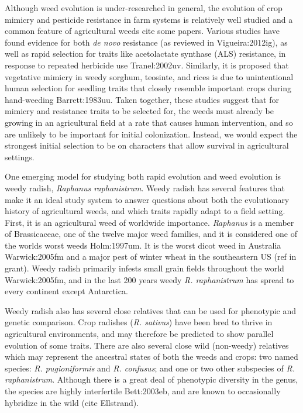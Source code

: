\documentclass[twocolumn]{bmcart}%
\begin{document}
Although weed evolution is under-researched in general, the evolution of crop mimicry and pesticide resistance in farm systems is relatively well studied and a common feature of agricultural weeds {cite some papers}. Various studies have found evidence for both \textit{de novo} resistance (as reviewed in {Vigueira:2012ig}), as well as rapid selection for traits like acetolactate synthase (ALS) resistance, in response to repeated herbicide use {Tranel:2002uv}. Similarly, it is proposed that vegetative mimicry in weedy sorghum, teosinte, and rices is due to unintentional human selection for seedling traits that closely resemble important crops during hand-weeding {Barrett:1983uu}.  Taken together, these studies suggest that for mimicry and resistance traits to be selected for, the weeds must already be growing in an agricultural field at a rate that causes human intervention, and so are unlikely to be important for initial colonization. Instead, we would expect the strongest initial selection to be on characters that allow survival in agricultural settings. 
%
%
%
%
%
%
    
One emerging model for studying both rapid evolution and weed evolution is weedy radish, \textit{Raphanus raphanistrum}. Weedy radish has several features that make it an ideal study system to answer questions about both the evolutionary history of agricultural weeds, and which traits rapidly adapt to a field setting. First, it is an agricultural weed of worldwide importance. \textit{Raphanus} is a member of Brassicaceae, one of the twelve major weed families, and it is considered one of the worlds worst weeds {Holm:1997um}. It is the worst dicot weed in Australia {Warwick:2005fm} and a major pest of winter wheat in the southeastern US (ref in grant). Weedy radish primarily infests small grain fields throughout the world {Warwick:2005fm}, and in the last 200 years weedy \textit{R. raphanistrum} has spread to every continent except Antarctica.
%
%
%

Weedy radish also has several close relatives that can be used for phenotypic and genetic comparison. Crop radishes (\textit{R. sativus}) have been bred to thrive in agricultural environments, and may therefore be predicted to show parallel evolution of some traits. There are also several close wild (non-weedy) relatives which may represent the ancestral states of both the weeds and crops: two named species: \textit{R. pugioniformis} and \textit{R. confusus}; and one or two other subspecies of \textit{R. raphanistrum}. Although there is a great deal of phenotypic diversity in the genus, the species are highly interfertile {Bett:2003eb}, and are known to occasionally hybridize in the wild (cite Ellstrand).
\end{document}

